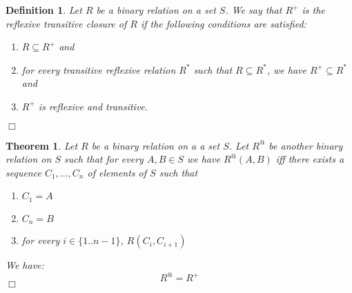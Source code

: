\documentclass[a4paper,12pt]{article}
\title{}
\author{}
\newtheorem{definition}{Definition}
\newtheorem{theorem}{Theorem}
\newcommand\red[1]{{\color{red}#1}}
\begin{document}
\begin{definition}
{\rm
Let $R$ be a binary relation on a set $S$. We say that $R^+$ is the reflexive transitive closure of $R$
 if the following conditions are satisfied: 
\begin{enumerate}
\item $R \subseteq R^+$ and 
\item for every transitive reflexive relation $R^*$ such that $R \subseteq R^*$, we have $R^+ \subseteq R^*$ and
\item \red{$R^+$ is reflexive and transitive.} 
\end{enumerate}
}
\hfill $\Box$   
\end{definition}

\begin{theorem}
{\rm
Let $R$ be a binary relation on a a set $S$.
Let $R^@$ be another binary relation on $S$ such that for every $A,B \in S$ we have $R^@(A,B)$ iff there exists a sequence $C_1,\ldots,C_n$ of elements of $S$ such that 
\begin{enumerate}
\item $C_1 = A$
\item $C_n = B$
\item for every $i \in \{1..n-1\}$, $R(C_i, C_{i+1})$
\end{enumerate} 
We have:
$$ R^@ = R^+$$
\hfill $\Box$
}
\end{theorem}
\end{document}
